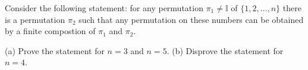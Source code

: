 Consider the following statement: for any permutation $\pi_1\not=\mathbb{I}$ of $\{1,2,...,n\}$ there is a permutation $\pi_2$ such that any permutation on these numbers can be obtained by a finite compostion of $\pi_1$ and $\pi_2$.

(a) Prove the statement for $n=3$ and $n=5$.
(b) Disprove the statement for $n=4$.